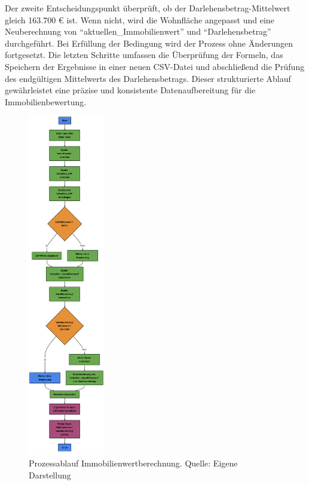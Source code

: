Der zweite Entscheidungspunkt überprüft, ob der Darlehensbetrag-Mittelwert gleich 163.700 € ist. Wenn nicht, wird die Wohnfläche angepasst und eine Neuberechnung von \enquote{aktuellen\_Immobilienwert} und \enquote{Darlehensbetrag} durchgeführt. Bei Erfüllung der Bedingung wird der Prozess ohne Änderungen fortgesetzt. Die letzten Schritte umfassen die Überprüfung der Formeln, das Speichern der Ergebnisse in einer neuen CSV-Datei und abschließend die Prüfung des endgültigen Mittelwerts des Darlehensbetrags. Dieser strukturierte Ablauf gewährleistet eine präzise und konsistente Datenaufbereitung für die Immobilienbewertung.

\begin{figure}[H]
    \centering
    \includegraphics[width=0.3\textwidth]{figures/flowchardatatensatz.png}
    \caption{Prozessablauf Immobilienwertberechnung. Quelle: Eigene Darstellung}
    \label{fig:flowchart}
\end{figure}

